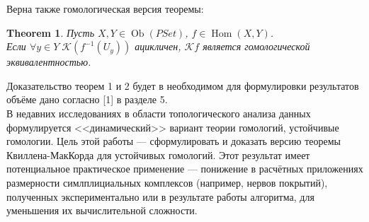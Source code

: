 \documentclass[a4paper, 12pt]{article}
\newtheorem{theorem}{Theorem}
\theoremstyle{definition}
\theoremstyle{remark}
\begin{document}
Верна также гомологическая версия теоремы:
\begin{theorem}
  Пусть $X, Y \in \operatorname{Ob}(PSet)$, $f \in \operatorname{Hom}(X,Y)$.\\
  Если $\forall y \in Y\;\mathcal{K}(f^{-1}(U_y))$ ацикличен, $\mathcal{K}f$ является гомологической эквивалентностью.\\
\end{theorem}

Доказательство теорем 1 и 2 будет в необходимом для формулировки результатов объёме дано согласно [1] в разделе 5.\\

В недавних исследованиях в области топологического анализа данных формулируется <<динамический>> вариант теории гомологий, устойчивые гомологии. Цель этой работы --- сформулировать и доказать версию теоремы Квиллена-МакКорда для устойчивых гомологий. Этот результат имеет потенциальное практическое применение --- понижение в расчётных приложениях размерности симлплициальных комплексов (например, нервов покрытий), полученных экспериментально или в результате работы алгоритма, для уменьшения их вычислительной сложности.
\end{document}
